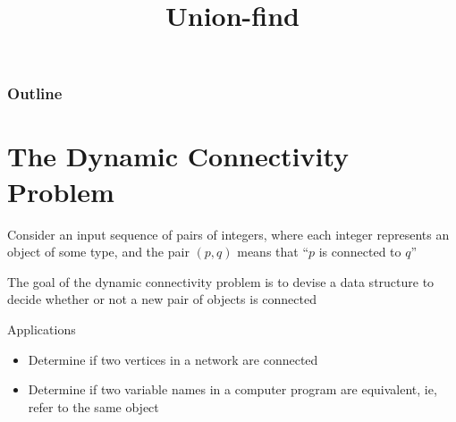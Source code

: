 \documentclass[8pt,a4paper,compress]{beamer}
\title{Union-find}
\date{}
\begin{document}
\begin{frame}
\vfill
\titlepage
\end{frame}

\begin{frame}
\frametitle{Outline}
\tableofcontents
\end{frame}

\section{The Dynamic Connectivity Problem}
\begin{frame}[fragile]
\begin{minipage}{250pt}
\pause

Consider an input sequence of pairs of integers, where each integer represents an object of some type, and the pair $(p, q)$ means that ``$p$ is connected to $q$''

\pause
\bigskip

The goal of the dynamic connectivity problem is to devise a data structure to decide whether or not a new pair of objects is connected 

\pause
\bigskip

Applications
\begin{itemize}
\item Determine if two vertices in a network are connected

\item Determine if two variable names in a computer program are equivalent, ie, refer to the same object


\end{itemize}
\end{minipage}
\end{frame}
\end{document}
